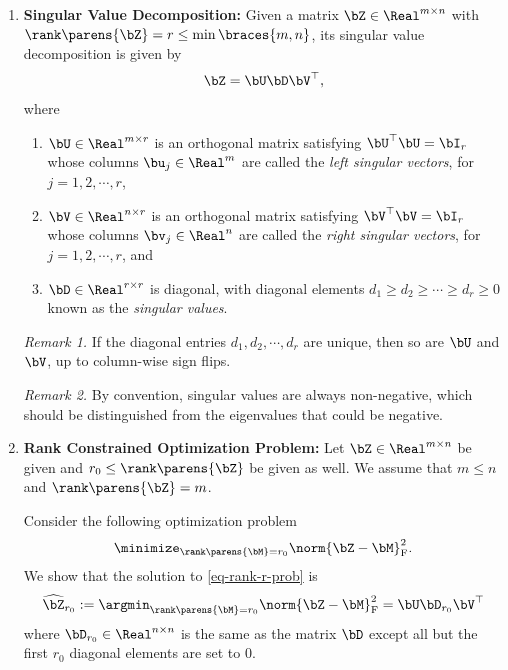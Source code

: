 \documentclass[12pt]{article}
\begin{document}
\begin{enumerate}[label=\textbf{\arabic*.}]

	\item \textbf{Singular Value Decomposition:} Given a matrix $\bZ \in \Real^{m \times n}$ with $\rank \parens{\bZ} = r \le \min \braces{m, n}$, its singular value decomposition is given by 
	\begin{align*}
		\bZ = \bU \bD \bV^\top, 
	\end{align*}
	where 
	\begin{enumerate}
		\item $\bU \in \Real^{m \times r}$ is an orthogonal matrix satisfying $\bU^\top \bU = \bI_r$ whose columns $\bu_j \in \Real^m$ are called the \emph{left singular vectors}, for $j = 1, 2, \cdots, r$, 
		\item $\bV \in \Real^{n \times r}$ is an orthogonal matrix satisfying $\bV^\top \bV = \bI_r$ whose columns $\bv_j \in \Real^n$ are called the \emph{right singular vectors}, for $j = 1, 2, \cdots, r$, and 
		\item $\bD \in \Real^{r \times r}$ is diagonal, with diagonal elements $d_1 \ge d_2 \ge \cdots \ge d_r \ge 0$ known as the \emph{singular values}. 
	\end{enumerate}
	
	\textit{Remark 1.} If the diagonal entries $d_1, d_2, \cdots, d_r$ are unique, then so are $\bU$ and $\bV$, up to column-wise sign flips. 
	
	\textit{Remark 2.} By convention, singular values are always non-negative, which should be distinguished from the eigenvalues that could be negative. 
	
	\item \textbf{Rank Constrained Optimization Problem:} Let $\bZ \in \Real^{m \times n}$ be given and $r_0 \le \rank \parens{\bZ}$ be given as well. We assume that $m \le n$ and $\rank \parens{\bZ} = m$. 
	
	Consider the following optimization problem 
	\begin{align}\label{eq-rank-r-prob}
		\minimize_{\rank \parens{\bM} = r_0} \norm{\bZ - \bM}_{\mathrm{F}}^2. 
	\end{align}
	We show that the solution to \eqref{eq-rank-r-prob} is 
	\begin{align*}
		\widehat{\bZ}_{r_0} := \argmin_{\rank \parens{\bM} = r_0} \norm{\bZ - \bM}_{\mathrm{F}}^2 = \bU \bD_{r_0} \bV^\top
	\end{align*}
	where $\bD_{r_0} \in \Real^{n \times n}$ is the same as the matrix $\bD$ except all but the first $r_0$ diagonal elements are set to 0. 
	

\end{enumerate}
\end{document}
